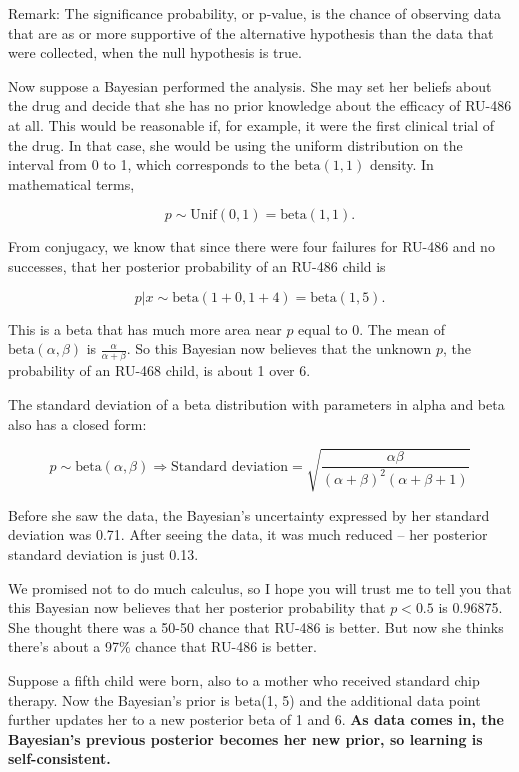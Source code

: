 \documentclass[]{book}
\theoremstyle{definition}
\theoremstyle{definition}
\theoremstyle{definition}
\theoremstyle{remark}
\begin{document}
Remark: The significance probability, or p-value, is the chance of
observing data that are as or more supportive of the alternative
hypothesis than the data that were collected, when the null hypothesis
is true.

Now suppose a Bayesian performed the analysis. She may set her beliefs
about the drug and decide that she has no prior knowledge about the
efficacy of RU-486 at all. This would be reasonable if, for example, it
were the first clinical trial of the drug. In that case, she would be
using the uniform distribution on the interval from 0 to 1, which
corresponds to the \(\text{beta}(1,1)\) density. In mathematical terms,

\[p \sim \text{Unif}(0,1) = \text{beta}(1,1).\]

From conjugacy, we know that since there were four failures for RU-486
and no successes, that her posterior probability of an RU-486 child is

\[p|x \sim \text{beta}(1+0,1+4) = \text{beta}(1,5).\]

This is a beta that has much more area near \(p\) equal to 0. The mean
of \(\text{beta}(\alpha,\beta)\) is \(\frac{\alpha}{\alpha+\beta}\). So
this Bayesian now believes that the unknown \(p\), the probability of an
RU-468 child, is about 1 over 6.

The standard deviation of a beta distribution with parameters in alpha
and beta also has a closed form:

\[p \sim \text{beta}(\alpha,\beta) \Rightarrow \text{Standard deviation} = \sqrt{\frac{\alpha\beta}{(\alpha+\beta)^2(\alpha+\beta+1)}}\]

Before she saw the data, the Bayesian's uncertainty expressed by her
standard deviation was 0.71. After seeing the data, it was much reduced
-- her posterior standard deviation is just 0.13.

We promised not to do much calculus, so I hope you will trust me to tell
you that this Bayesian now believes that her posterior probability that
\(p < 0.5\) is 0.96875. She thought there was a 50-50 chance that RU-486
is better. But now she thinks there's about a 97\% chance that RU-486 is
better.

Suppose a fifth child were born, also to a mother who received standard
chip therapy. Now the Bayesian's prior is beta(1, 5) and the additional
data point further updates her to a new posterior beta of 1 and 6.
\textbf{As data comes in, the Bayesian's previous posterior becomes her
new prior, so learning is self-consistent.}
\end{document}
